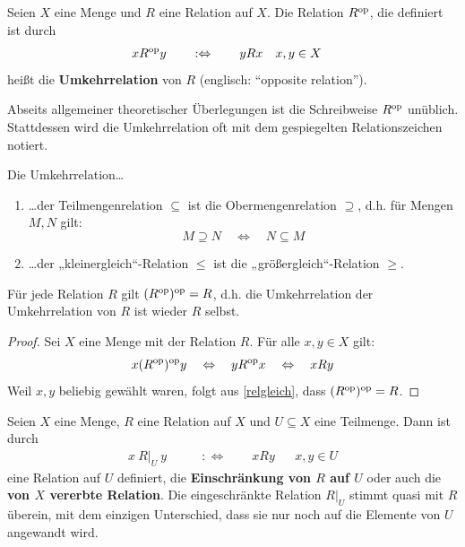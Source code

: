 \begin{defin}[Umkehrrelation] \label{def:umkehrrel} 
    Seien $X$ eine Menge und $R$ eine Relation auf $X$. Die Relation $R^{\mathrm{op}}$, die definiert ist durch
    \begin{align*}
        xR^{\mathrm{op}} y \qquad &:\Leftrightarrow\qquad yRx && x,y\in X
    \end{align*}
    heißt die \textbf{Umkehrrelation} von $R$ (englisch: ``opposite relation''). 
\end{defin}


\begin{nota} \label{spiegelrel}
    Abseits allgemeiner theoretischer Überlegungen ist die Schreibweise $R^{\mathrm{op}}$ unüblich. Stattdessen wird die Umkehrrelation oft mit dem gespiegelten Relationszeichen  notiert.
\end{nota}


\begin{bsp}
    Die Umkehrrelation\dots
    \begin{enumerate}
        \item \dots der Teilmengenrelation $\subseteq$ ist die Obermengenrelation $\supseteq$, d.h. für Mengen $M,N$ gilt:
            \[M\supseteq N \quad\iff\quad N\subseteq M \]
        \item \dots der „kleinergleich“-Relation $\le$ ist die „größergleich“-Relation $\ge$.
    \end{enumerate}
\end{bsp}


\begin{bem}[*]
    Für jede Relation $R$ gilt $(R^{\mathrm{op}})^{\mathrm{op}}=R$, d.h. die Umkehrrelation der Umkehrrelation von $R$ ist wieder $R$ selbst.
\end{bem}
\begin{proof}
    Sei $X$ eine Menge mit der Relation $R$. Für alle $x,y\in X$ gilt:
        \[ x(R^{\mathrm{op}})^{\mathrm{op}} y \quad\Leftrightarrow\quad yR^{\mathrm{op}} x \quad\Leftrightarrow\quad xRy  \]
    Weil $x,y$ beliebig gewählt waren, folgt aus \cref{relgleich}, dass $(R^{\mathrm{op}})^{\mathrm{op}} = R$.
\end{proof}


\begin{defin} \label{def:einschraenkungrelation} 
    Seien $X$ eine Menge, $R$ eine Relation auf $X$ und $U\subseteq X$ eine Teilmenge. Dann ist durch
    \begin{align*}
        x\ R\vert_U\ y \qquad& :\Leftrightarrow\qquad xRy &&x,y\in U
    \end{align*}
    eine Relation auf $U$ definiert, die \textbf{Einschränkung von $R$ auf $U$} oder auch die \textbf{von $X$ vererbte Relation}. Die eingeschränkte Relation $R\vert_U$ stimmt quasi mit $R$ überein, mit dem einzigen Unterschied, dass sie nur noch auf die Elemente von $U$ angewandt wird.
\end{defin}


